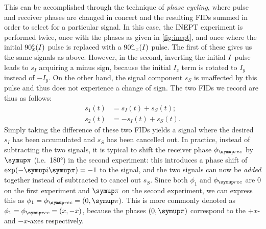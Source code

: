 This can be accomplished through the technique of \textit{phase cycling}, where pulse and receiver phases are changed in concert and the resulting FIDs summed in order to select for a particular signal.
In this case, the INEPT experiment is performed twice, once with the phases as given in \cref{fig:inept}, and once where the initial $\angang{90}{x}(I)$ pulse is replaced with a $\angang{90}{-x}(I)$ pulse.
The first of these gives us the same signals as above.
However, in the second, inverting the initial $I\/$ pulse leads to $s_I$ acquiring a minus sign, because the initial $I_z$ term is rotated to $I_y$ instead of $-I_y$.
On the other hand, the signal component $s_S$ is unaffected by this pulse and thus does not experience a change of sign.
The two FIDs we record are thus as follows:
\begin{align}
    \label{eq:inept_phase_cycling}
    s_1(t) &= s_I(t) + s_S(t); \\
    s_2(t) &= -s_I(t) + s_S(t).
\end{align}
Simply taking the difference of these two FIDs yields a signal where the desired $s_I$ has been accumulated and $s_S$ has been cancelled out.
In practice, instead of subtracting the two signals, it is typical to shift the receiver phase $\phirec$ by $\cpi$ (i.e.\ \ang{180}) in the second experiment: this introduces a phase shift of $\exp(-\mi\cpi) = -1$ to the signal, and the two signals can now be \textit{added} together instead of subtracted to cancel out $s_S$.
Since both $\phi_1$ and $\phirec$ are $0$ on the first experiment and $\cpi$ on the second experiment, we can express this as $\phi_1 = \phirec = (0, \cpi)$.
This is more commonly denoted as $\phi_1 = \phirec = (x, -x)$, because the phases $(0, \cpi)$ correspond to the $+x$- and $-x$-axes respectively.

